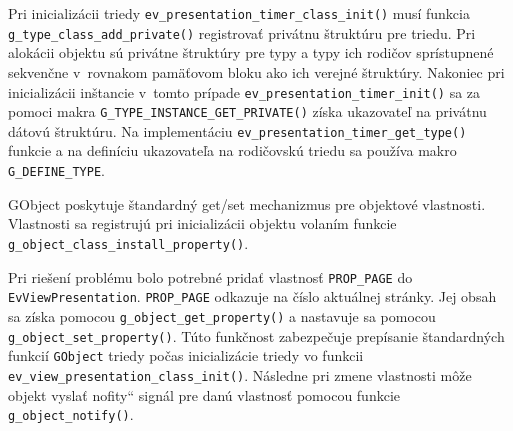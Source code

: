 \documentclass[12pt,oneside,final]{fithesis2}
\newcommand\uv[1]{\quotedblbase #1\textquotedblleft}
\begin{document}
Pri inicializácii triedy \texttt{ev\_\-presentation\_\-timer\_\-class\_\-init()} musí funkcia \texttt{g\_\-type\_\-class\_\-add\_\-private()} registrovať privátnu štruktúru pre triedu\cite{gprivate}. Pri alokácii objektu sú privátne štruktúry pre typy a typy ich rodičov sprístupnené sekvenčne v~rovnakom pamäťovom bloku ako ich verejné štruktúry. Nakoniec pri inicializácii inštancie v~tomto prípade \texttt{ev\_\-presentation\_\-timer\_\-init()} sa za pomoci makra \texttt{G\_\-TYPE\_\-INSTANCE\_\-GET\_\-PRIVATE()} získa ukazovateľ na privátnu dátovú štruktúru. Na implementáciu \texttt{ev\_\-presentation\_\-timer\_\-get\_\-type()} funkcie a na definíciu ukazovateľa na rodičovskú triedu sa používa makro \texttt{G\_\-DEFINE\_\-TYPE}.

GObject poskytuje štandardný get/set mechanizmus pre objektové vlastnosti. Vlastnosti sa registrujú pri inicializácii objektu volaním funkcie \texttt{g\_\-object\_\-class\_\-install\_\-property()}.

Pri riešení problému bolo potrebné pridať vlastnosť \texttt{PROP\_\-PAGE} do \texttt{EvViewPresentation}. \texttt{PROP\_\-PAGE} odkazuje na číslo aktuálnej stránky. Jej obsah sa získa pomocou \texttt{g\_\-object\_\-get\_\-property()} a nastavuje sa pomocou \texttt{g\_\-object\_\-set\_\-property()}. Túto funkčnost zabezpečuje prepísanie štandardných funkcií \texttt{GObject} triedy počas inicializácie triedy vo funkcii \texttt{ev\_\-view\_\-presentation\_\-class\_\-init()}. Následne pri zmene vlastnosti môže objekt vyslať \uv{nofity} signál pre danú vlastnosť pomocou funkcie \texttt{g\_\-object\_\-notify()}.
\end{document}

